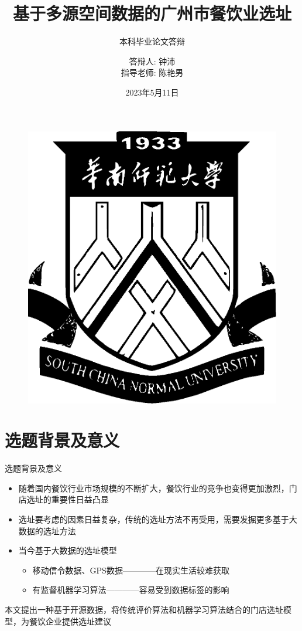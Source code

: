 \documentclass{beamer}
\title{基于多源空间数据的广州市餐饮业选址}
\subtitle{本科毕业论文答辩}
\author{答辩人: 钟沛 \\ 指导老师: 陈艳男}
\institute{华南师范大学数学科学学院}
\date{2023年5月11日}
\begin{document}
\kaishu
\begin{frame}
    \titlepage
    \begin{figure}[htpb]
        \begin{center}
            \includegraphics[width=0.15\linewidth]{pic/scnulogo.eps}
        \end{center}
    \end{figure}
\end{frame}

\begin{frame}
    \tableofcontents[sectionstyle=show,subsectionstyle=show/shaded/hide,subsubsectionstyle=show/shaded/hide]
\end{frame}


\section{选题背景及意义}
\begin{frame}{选题背景及意义}
    \begin{itemize}
        \item 随着国内餐饮行业市场规模的不断扩大，餐饮行业的竞争也变得更加激烈，门店选址的重要性日益凸显\pause
        \item 选址要考虑的因素日益复杂，传统的选址方法不再受用，需要发掘更多基于大数据的选址方法\pause
        \item 当今基于大数据的选址模型
            \begin{itemize}
                \item 移动信令数据、GPS数据————在现实生活较难获取
                \item 有监督机器学习算法————容易受到数据标签的影响
            \end{itemize}
    \end{itemize}\pause
    本文提出一种基于开源数据，将传统评价算法和机器学习算法结合的门店选址模型，为餐饮企业提供选址建议
\end{frame}
\end{document}
